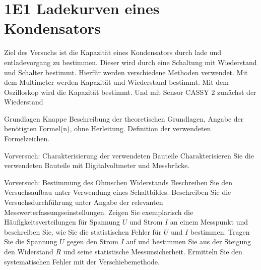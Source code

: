 \documentclass[twoside]{protokoll}
\begin{document}
 




 

\begin{versuchsziele}
\end{versuchsziele}

\section{1E1 Ladekurven eines Kondensators}


\begin{versuchsziele}
Ziel des Versuchs ist die Kapazität eines Kondensators durch lade und entladevorgang
zu bestimmen. 
Dieser wird durch eine Schaltung mit Wiederstand und Schalter bestimmt.
Hierfür werden verschiedene Methoden verwendet. Mit dem Multimeter werden Kapazität
und Wiederstand bestimmt.
Mit dem Oszilloskop wird die Kapazität bestimmt. Und mit Sensor CASSY 2 zunächst der 
Wiederstand 
\end{versuchsziele}


\begin{aufgabe}{Grundlagen}
  Knappe Beschreibung der theoretischen Grundlagen, Angabe der
  benötigten Formel(n), ohne Herleitung. Definition der verwendeten
  Formelzeichen.
\end{aufgabe}




\begin{aufgabe}{Vorversuch: Charakterisierung der verwendeten Bauteile}
  Charakterisieren Sie die verwendeten Bauteile mit Digitalvoltmeter
  und Messbrücke.
\end{aufgabe}


\begin{aufgabe}{Vorversuch: Bestimmung des Ohmschen Widerstands}
  Beschreiben Sie den Versuchsaufbau unter Verwendung eines
  Schaltbildes. Beschreiben Sie die Versuchsdurchführung unter Angabe
  der relevanten Messwerterfassungseinstellungen. Zeigen Sie
  exemplarisch die Häufigkeitsverteilungen für Spannung $U$ und Strom
  $I$ an einem Messpunkt und beschreiben Sie, wie Sie die
  statistischen Fehler für $U$ und $I$ bestimmen. Tragen Sie die
  Spannung $U$ gegen den Strom $I$ auf und bestimmen Sie aus der
  Steigung den Widerstand $R$ und seine statistische
  Messunsicherheit. Ermitteln Sie den systematischen Fehler mit der
  Verschiebemethode.
\end{aufgabe}
\end{document}

